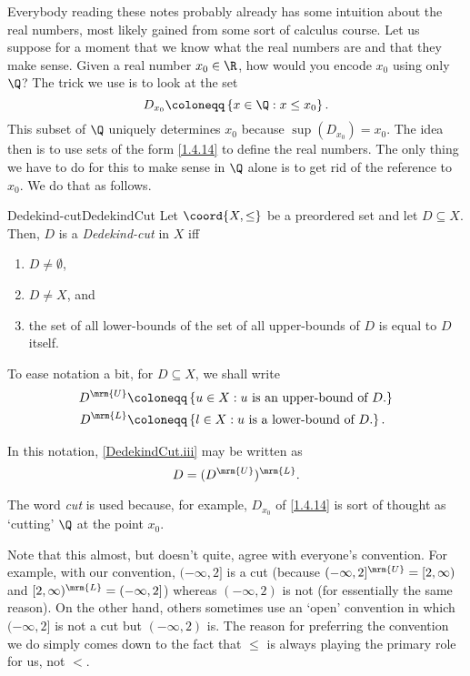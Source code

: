 Everybody reading these notes probably already has some intuition about the real numbers, most likely gained from some sort of calculus course.  Let us suppose for a moment that we know what the real numbers are and that they make sense.  Given a real number $x_0\in \R$, how would you encode $x_0$ using only $\Q$?  The trick we use is to look at the set
\begin{equation}\label{1.4.14}
D_{x_0}\coloneqq \left\{ x\in \Q :x\leq x_0\right\} .
\end{equation}
This subset of $\Q$ uniquely determines $x_0$ because $\sup (D_{x_0})=x_0$.  The idea then is to use sets of the form \eqref{1.4.14} to define the real numbers.  The only thing we have to do for this to make sense in $\Q$ alone is to get rid of the reference to $x_0$.  We do that as follows.
\begin{dfn}{Dedekind-cut}{DedekindCut}
Let $\coord{X,\leq}$ be a preordered set and let $D\subseteq X$.  Then, $D$ is a \emph{Dedekind-cut} in $X$ iff
\begin{enumerate}
\item \label{DedekindCut.i}$D\neq \emptyset$, 
\item \label{DedekindCut.ii}$D\neq X$, and
\item \label{DedekindCut.iii}the set of all lower-bounds of the set of all upper-bounds of $D$ is equal to $D$ itself.
\end{enumerate}
\begin{rmk}
To ease notation a bit, for $D\subseteq X$, we shall write
\begin{equation}
\begin{aligned}
D^{\mrm{U}} & \coloneqq \left\{ u\in X:u\text{ is an upper-bound of }D\text{.}\right\} \\
D^{\mrm{L}} & \coloneqq \left\{ l\in X:u\text{ is a lower-bound of }D\text{.}\right\} .
\end{aligned}
\end{equation}
\end{rmk}
In this notation, \eqref{DedekindCut.iii} may be written as
\begin{equation}
D=(D^{\mrm{U}})^{\mrm{L}}.
\end{equation}
\begin{rmk}
The word \emph{cut} is used because, for example, $D_{x_0}$ of \eqref{1.4.14} is sort of thought as `cutting' $\Q$ at the point $x_0$.
\end{rmk}
\begin{rmk}
Note that this almost, but doesn't quite, agree with everyone's convention.  For example, with our convention, $(-\infty ,2]$ is a cut (because $(-\infty ,2]^{\mrm{U}}=[2,\infty )$ and $[2,\infty )^{\mrm{L}}=(-\infty ,2]$) whereas $(-\infty ,2)$ is not (for essentially the same reason).  On the other hand, others sometimes use an `open' convention in which $(-\infty ,2]$ is not a cut but $(-\infty ,2)$ is.  The reason for preferring the convention we do simply comes down to the fact that $\leq$ is always playing the primary role for us, not $<$.
\end{rmk}
\end{dfn}
